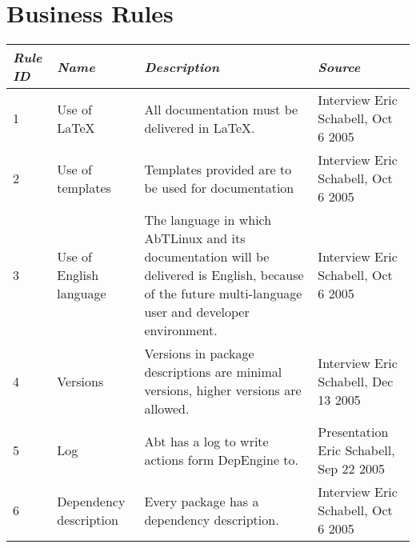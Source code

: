 \section{Business Rules}

\begin{tabular}[l]{|p{}|p{}|p{5cm}|p{}|}
\hline
\em{Rule ID} & \em{Name} & \em{Description} & \em{Source}\\
\hline
1 & Use of LaTeX & All documentation must be delivered in LaTeX. & Interview Eric Schabell, Oct 6 2005\\
\hline
2 & Use of templates & Templates provided are to be used for documentation & Interview Eric Schabell, Oct 6 2005 
\\
\hline
3 & Use of English language & The language in which AbTLinux and its documentation will be delivered is English, because of the future multi-language user and developer environment. & Interview Eric Schabell, Oct 6 2005 
\\
\hline
4 & Versions & Versions in package descriptions are minimal versions, higher versions are allowed. & Interview Eric Schabell, Dec 13 2005 
\\
\hline
5 & Log & Abt has a log to write actions form DepEngine to. & Presentation Eric Schabell, Sep 22 2005 
\\
\hline
6 & Dependency description & Every package has a dependency description. & Interview Eric Schabell, Oct 6 2005 
\\
\hline
\end{tabular}
